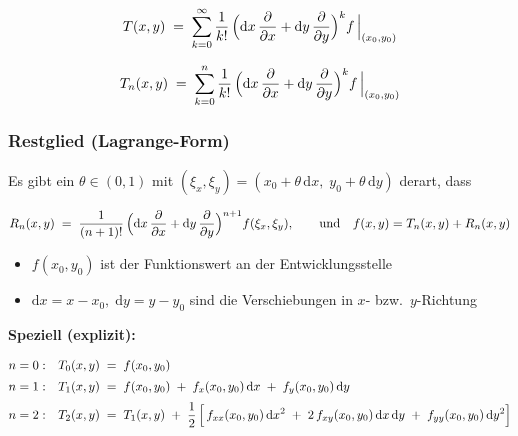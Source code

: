 \documentclass[a4paper,11pt,oneside,open=any,parskip=half, DIV=15]{scrreprt}
\begin{document}
      \begin{importantbox}
         \[
            T(x,y) \;=\; \sum_{k=0}^{\infty} \frac{1}{k!}\,
            \Bigl(\mathrm{d}x\,\frac{\partial}{\partial x} + \mathrm{d}y\,\frac{\partial}{\partial y}\Bigr)^{k} f \,\Big|_{(x_0,y_0)}
         \]
      \end{importantbox}

      \begin{importantbox}
         \[
            T_n(x,y) \;=\; \sum_{k=0}^{n} \frac{1}{k!}\,
            \Bigl(\mathrm{d}x\,\frac{\partial}{\partial x} + \mathrm{d}y\,\frac{\partial}{\partial y}\Bigr)^{k} f \,\Big|_{(x_0,y_0)}
         \]
      \end{importantbox}

   \subsubsection*{Restglied (Lagrange-Form)}
   Es gibt ein \(\theta\in(0,1)\) mit \((\xi_x,\xi_y)=(x_0+\theta\,\mathrm{d}x,\;y_0+\theta\,\mathrm{d}y)\) derart, dass
   \begin{importantbox}
   \[
   R_n(x,y) \;=\; \frac{1}{(n+1)!}\,
   \Bigl(\mathrm{d}x\,\frac{\partial}{\partial x} + \mathrm{d}y\,\frac{\partial}{\partial y}\Bigr)^{n+1} f(\xi_x,\xi_y),
   \qquad\text{und}\quad f(x,y)=T_n(x,y)+R_n(x,y)
   \]
   \end{importantbox}

   \begin{itemize}
   \item \(f(x_0,y_0)\) ist der Funktionswert an der Entwicklungsstelle
   \item \(\mathrm{d}x=x-x_0,\; \mathrm{d}y=y-y_0\) sind die Verschiebungen in \(x\)- bzw.\ \(y\)-Richtung
   \end{itemize}

   \textbf{Speziell (explizit):}
   \begin{importantbox}
   \begin{align*}
   n=0:\quad & T_0(x,y) \;=\; f(x_0,y_0)\\[2pt]
   n=1:\quad & T_1(x,y) \;=\; f(x_0,y_0)\;+\; f_x(x_0,y_0)\,\mathrm{d}x \;+\; f_y(x_0,y_0)\,\mathrm{d}y\\[2pt]
   n=2:\quad & T_2(x,y) \;=\; T_1(x,y)\;+\;\frac{1}{2}\,\Bigl[\, f_{xx}(x_0,y_0)\,\mathrm{d}x^{2}
                  \;+\; 2\,f_{xy}(x_0,y_0)\,\mathrm{d}x\,\mathrm{d}y
                  \;+\; f_{yy}(x_0,y_0)\,\mathrm{d}y^{2}\Bigr]
   \end{align*}
   \end{importantbox}
\end{document}
